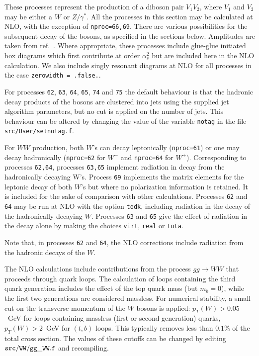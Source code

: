 These processes represent the production of a diboson pair $V_1 V_2$,
where $V_1$ and $V_2$ may be either a $W$ or $Z/\gamma^*$. 
All the processes in this section may be calculated at NLO, with the exception
of {\tt nproc=66,69}. There are various
possibilities for the subsequent decay of the bosons, as specified in the
sections below. Amplitudes are taken from ref.~\cite{Dixon:1998py}.
Where appropriate, these processes include glue-glue initiated box diagrams
which first contribute at order $\alpha_s^2$ but are included here in the
NLO calculation. We also include singly resonant diagrams at NLO for all processes
in the case {\tt zerowidth = .false.}.

For processes {\tt 62}, {\tt 63}, {\tt 64}, {\tt 65}, {\tt 74}
and {\tt 75} the default behaviour is that the hadronic decay products
of the bosons are clustered into jets using the supplied jet
algorithm parameters, but no cut is applied on the number of jets.
This behaviour can be altered by changing the value of the
variable {\tt notag} in the file {\tt src/User/setnotag.f}.
 

For $WW$ production, both $W$'s can decay leptonically ({\tt nproc=61}) or one
may decay hadronically ({\tt nproc=62} for $W^-$ and {\tt nproc=64} for $W^+$).
Corresponding to processes {\tt 62,64}, processes {\tt 63,65} implement radiation in 
decay from the hadronically decaying W's.
Process {\tt 69} implements the matrix elements for the leptonic decay of
both $W$'s but where no polarization information is retained. It is included
for the sake of comparison with other calculations.
Processes {\tt 62} and {\tt 64} may be run at NLO with the option {\tt todk},
including radiation in the decay of the hadronically decaying $W$.
Processes {\tt 63} and {\tt 65} give the effect of radiation in the decay alone
by making the choices {\tt virt},  {\tt real} or {\tt tota}.

Note that, in processes
{\tt 62} and {\tt 64}, the NLO corrections include radiation from the
hadronic decays of the $W$.

The NLO calculations include contributions from the process $gg \to WW$
that proceeds through quark loops. The calculation of loops containing the third quark generation
includes the effect of the top quark mass (but $m_b=0$), while the first two
generations are considered massless. For numerical stability, a small cut on the
transverse momentum of the $W$ bosons is applied: $p_T(W)>0.05$~GeV for loops
containing massless (first or second generation) quarks, $p_T(W)>2$~GeV for $(t,b)$
loops. This typically removes less than $0.1$\% of the total cross section. The
values of these cutoffs can be changed by editing ${\tt src/WW/gg\_WW.f}$ and recompiling.


